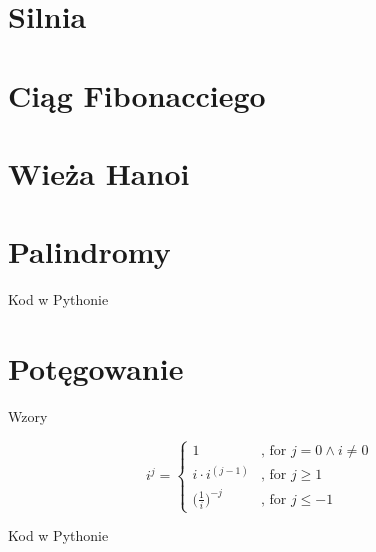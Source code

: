 
\section{Silnia}\label{sec:factorial}



\section{Ciąg Fibonacciego}\label{sec:fibonacci}



\section{Wieża Hanoi}\label{sec:hanoi}



\section{Palindromy}\label{sec:palindrome}
\begin{frame}[fragile]{Kod w Pythonie}
    
\end{frame}


\section{Potęgowanie}\label{sec:exponentiation}
\begin{frame}{Wzory}
    \begin{definition}[recursion]
        \[ i^j =
        \begin{cases}
            1 & \text{, for } j = 0 \land i \neq 0 \\
            i \cdot i^{(j-1)} & \text{, for } j \geq 1 \\
            \Big( \frac{1}{i} \Big) ^{-j} & \text{, for } j \leq -1
        \end{cases}
        \]
    \end{definition}
\end{frame}
\begin{frame}{Kod w Pythonie}
    
    
\end{frame}


